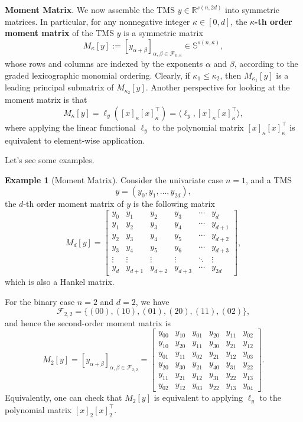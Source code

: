\documentclass[
]{book}
\theoremstyle{definition}
\theoremstyle{definition}
\newtheorem{example}{Example}[chapter]
\theoremstyle{definition}
\theoremstyle{definition}
\theoremstyle{remark}
\begin{document}
\textbf{Moment Matrix}. We now assemble the TMS \(y \in \mathbb{R}^{s(n,2d)}\) into symmetric matrices. In particular, for any nonnegative integer \(\kappa \in [0,d]\), the \textbf{\(\kappa\)-th order moment matrix} of the TMS \(y\) is a symmetric matrix
\[
M_\kappa[y]:= [y_{\alpha + \beta}]_{\alpha,\beta \in \mathcal{F}_{n,\kappa}} \in \mathbb{S}^{s(n,\kappa)},
\]
whose rows and columns are indexed by the exponents \(\alpha\) and \(\beta\), according to the graded lexicographic monomial ordering. Clearly, if \(\kappa_1 \leq \kappa_2\), then \(M_{\kappa_1}[y]\) is a leading principal submatrix of \(M_{\kappa_2}[y]\). Another perspective for looking at the moment matrix is that
\[
M_{\kappa}[y] = \ell_y ([x]_{\kappa} [x]_{\kappa}^\top) = \langle \ell_y, [x]_{\kappa} [x]_{\kappa}^\top \rangle,
\]
where applying the linear functional \(\ell_y\) to the polynomial matrix \([x]_{\kappa} [x]_{\kappa}^\top\) is equivalent to element-wise application.

Let's see some examples.

\begin{example}[Moment Matrix]
\protect\hypertarget{exm:MomentMatrix}{}\label{exm:MomentMatrix}Consider the univariate case \(n=1\), and a TMS
\[
y = (y_0,y_1,\dots,y_{2d}),
\]
the \(d\)-th order moment matrix of \(y\) is the following matrix
\[
M_d[y] = \begin{bmatrix}
y_0 & y_1 & y_2 & y_3 & \cdots & y_d \\
y_1 & y_2 & y_3 & y_4 & \cdots & y_{d+1} \\
y_2 & y_3 & y_4 & y_5 & \cdots & y_{d+2} \\
y_3 & y_4 & y_5 & y_6 & \cdots & y_{d+3} \\
\vdots & \vdots & \vdots & \vdots & \ddots & \vdots \\
y_d & y_{d+1} & y_{d+2} & y_{d+3} & \cdots & y_{2d}
\end{bmatrix},
\]
which is also a Hankel matrix.

For the binary case \(n=2\) and \(d=2\), we have
\[
\mathcal{F}_{2,2} = \{ (00),(10),(01),(20),(11),(02) \},
\]
and hence the second-order moment matrix is
\begin{equation}
M_2[y] = [y_{\alpha + \beta}]_{\alpha,\beta \in \mathcal{F}_{2,2}} = \begin{bmatrix}
y_{00} & y_{10} & y_{01} & y_{20} & y_{11} & y_{02} \\
y_{10} & y_{20} & y_{11} & y_{30} & y_{21} & y_{12} \\
y_{01} & y_{11} & y_{02} & y_{21} & y_{12} & y_{03} \\
y_{20} & y_{30} & y_{21} & y_{40} & y_{31} & y_{22} \\
y_{11} & y_{21} & y_{12} & y_{31} & y_{22} & y_{13} \\
y_{02} & y_{12} & y_{03} & y_{22} & y_{13} & y_{04}
\end{bmatrix}.
\label{eq:example-second-order-moment-mat}
\end{equation}
Equivalently, one can check that \(M_2[y]\) is equivalent to applying \(\ell_y\) to the polynomial matrix \([x]_2 [x]_2^\top\).
\end{example}
\end{document}
